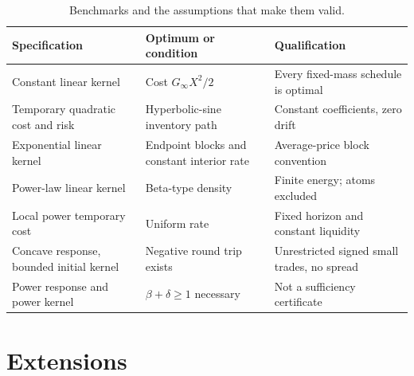\documentclass[11pt]{article}
\numberwithin{equation}{section}
\theoremstyle{definition}
\theoremstyle{remark}
\theoremstyle{definition}
\begin{document}
\begin{table}[tb]
\centering\small
\begin{tabularx}{\textwidth}{p{}YY}
\toprule Specification & Optimum or condition & Qualification \\
\midrule
Constant linear kernel & Cost $G_\infty X^2/2$ & Every fixed-mass schedule is optimal \\
Temporary quadratic cost and risk & Hyperbolic-sine inventory path & Constant coefficients, zero drift \\
Exponential linear kernel & Endpoint blocks and constant interior rate & Average-price block convention \\
Power-law linear kernel & Beta-type density & Finite energy; atoms excluded \\
Local power temporary cost & Uniform rate & Fixed horizon and constant liquidity \\
Concave response, bounded initial kernel & Negative round trip exists & Unrestricted signed small trades, no spread \\
Power response and power kernel & $\beta+\delta\geq1$ necessary & Not a sufficiency certificate \\
\bottomrule
\end{tabularx}
\caption{Benchmarks and the assumptions that make them valid.}
\label{tab:summary}
\end{table}

\section{Extensions}\label{sec:extensions}
\end{document}
